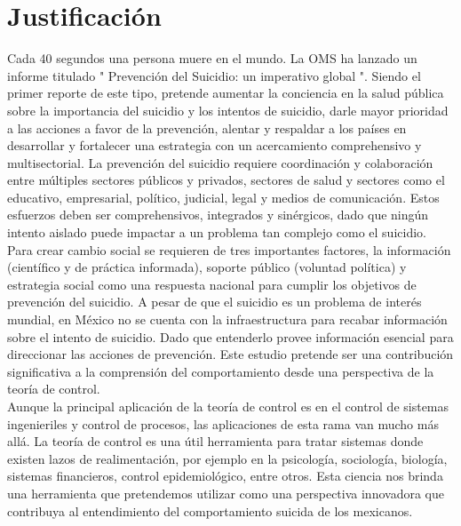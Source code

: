 \section{Justificación}
{
Cada 40 segundos una persona muere en el mundo. La OMS ha lanzado un informe titulado " Prevención del Suicidio: un imperativo global ". Siendo el primer reporte de este tipo, pretende aumentar la conciencia en la salud pública sobre la importancia del suicidio y los intentos de suicidio, darle mayor prioridad a las acciones a favor de la prevención, alentar y respaldar a los países en desarrollar y fortalecer una estrategia con un acercamiento  comprehensivo y multisectorial. La prevención del suicidio requiere coordinación y colaboración entre múltiples sectores públicos y privados, sectores de salud y  sectores como el educativo,  empresarial, político, judicial, legal y medios de comunicación.  Estos esfuerzos deben ser comprehensivos, integrados y sinérgicos, dado que ningún intento aislado puede impactar a un problema tan complejo como el suicidio. \\

Para crear cambio social se requieren de tres importantes factores, la información (científico y de práctica informada), soporte público (voluntad política) y estrategia social como una respuesta nacional para cumplir los objetivos de prevención del suicidio. A pesar de que el suicidio es un problema de interés mundial, en México no se cuenta con la infraestructura para recabar información sobre el intento de suicidio. Dado que entenderlo provee información esencial para direccionar las acciones de prevención. Este estudio pretende ser una contribución significativa a la comprensión del comportamiento desde una perspectiva de la teoría de control.\\

Aunque la principal aplicación de la teoría de control es en el control de sistemas ingenieriles y control de procesos, las aplicaciones de esta rama van mucho más allá. La teoría de control es una útil herramienta para tratar sistemas donde existen lazos de realimentación, por ejemplo en la psicología, sociología, biología, sistemas financieros, control epidemiológico, entre otros.  Esta ciencia nos brinda una herramienta que pretendemos utilizar como una perspectiva innovadora que contribuya al entendimiento del comportamiento suicida de los mexicanos.
}

